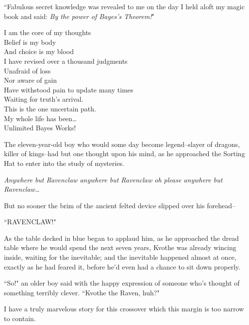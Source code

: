``Fabulous secret knowledge was revealed to me on the day I held aloft my magic book and said: \emph{By the power of Bayes's Theorem!}"


\begin{emph}
I am the core of my thoughts\\
Belief is my body\\
And choice is my blood\\
I have revised over a thousand judgments\\
Unafraid of loss\\
Nor aware of gain\\
Have withstood pain to update many times\\
Waiting for truth's arrival.\\
This is the one uncertain path.\\
My whole life has been{\ldots}\\
Unlimited Bayes Works!
\end{emph}


The eleven-year-old boy who would some day become legend\---slayer of dragons, killer of kings\---had but one thought upon his mind, as he approached the Sorting Hat to enter into the study of mysteries.

\emph{Anywhere but Ravenclaw anywhere but Ravenclaw oh please anywhere but Ravenclaw{\ldots}}

But no sooner the brim of the ancient felted device slipped over his forehead\---

``RAVENCLAW!"

As the table decked in blue began to applaud him, as he approached the dread table where he would spend the next seven years, Kvothe was already wincing inside, waiting for the inevitable; and the inevitable happened almost at once, exactly as he had feared it, before he'd even had a chance to sit down properly.

``So!" an older boy said with the happy expression of someone who's thought of something terribly clever. ``Kvothe the Raven, huh?"


I have a truly marvelous story for this crossover which this margin is too narrow to contain.


